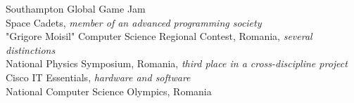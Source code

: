 
\bigskip
{}%
Southampton Global Game Jam\\
Space Cadets, \emph{member of an advanced programming society}\\
"Grigore Moisil" Computer Science Regional Contest, Romania, \emph{several distinctions}\\
National Physics Symposium, Romania, \emph{third place in a cross-discipline project}\\
Cisco IT Essentials, \emph{hardware and software}\\
National Computer Science Olympics, Romania \\
